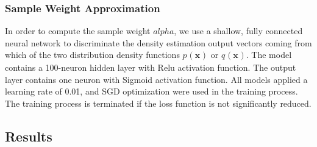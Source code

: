 \documentclass[mathfont=newtx]{uai2023} %
\newcommand{\px}[2]{p_{#1}(\mathbf{x_{#2}})}
\newcommand{\qx}[2]{q_{#1}(\mathbf{x_{#2}})}
\begin{document}
\subsubsection{Sample Weight Approximation} In order to compute the sample weight $alpha$, we use a shallow, fully connected neural network to discriminate the density estimation output vectors coming from which of the two distribution density functions $\px{}{}$ or $\qx{}{}$. The model contains a 100-neuron hidden layer with Relu activation function. The output layer contains one neuron with Sigmoid activation function. All models applied a learning rate of 0.01, and SGD optimization were used in the training process. The training process is terminated if the loss function is not significantly reduced.

\subsection{Results}
\end{document}
